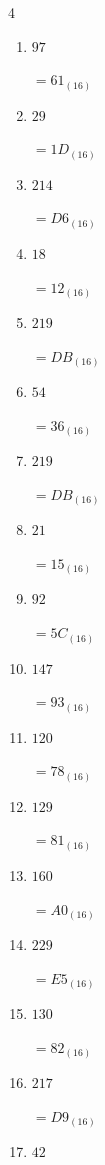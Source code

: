 \begin{multicols}{4}
\begin{enumerate}
  \item $97$

        $=61_{(16)}$

  \item $29$

        $=1D_{(16)}$

  \item $214$

        $=D6_{(16)}$

  \item $18$

        $=12_{(16)}$

  \item $219$

        $=DB_{(16)}$

  \item $54$

        $=36_{(16)}$

  \item $219$

        $=DB_{(16)}$

  \item $21$

        $=15_{(16)}$

\columnbreak %

  \item $92$

        $=5C_{(16)}$

  \item $147$

        $=93_{(16)}$

  \item $120$

        $=78_{(16)}$

  \item $129$

        $=81_{(16)}$

  \item $160$

        $=A0_{(16)}$

  \item $229$

        $=E5_{(16)}$

  \item $130$

        $=82_{(16)}$

  \item $217$

        $=D9_{(16)}$

  \item $42$


\end{enumerate}
\end{multicols}
